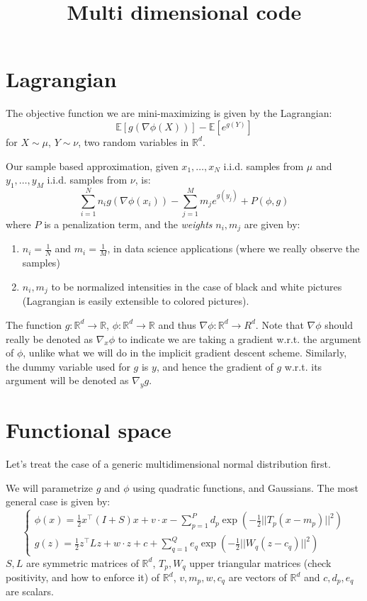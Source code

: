 \documentclass{article}
\title{Multi dimensional code}
\date{}
\theoremstyle{definition}
\theoremstyle{remark}
\newcommand{\R}{\mathbb{R}}
\newcommand{\E}{\mathbb{E}}
\newcommand{\1}{\mathbbm{1}}
\begin{document}
\maketitle
                                     
\section{Lagrangian}
The objective function we are mini-maximizing is given by the Lagrangian:
\[
\E \left[ g(\nabla \phi(X)) \right] - \E \left[ e^{g(Y)} \right] 
\]
for $X \sim \mu$, $Y \sim \nu$, two random variables in $\R^d$.

Our sample based approximation, given $x_1,\ldots,x_N$ i.i.d. samples from $\mu$ and $y_1,\ldots,y_M$ i.i.d. samples from $\nu$, is:
\[
\sum_{i=1}^N n_i g(\nabla \phi(x_i)) - \sum_{j=1}^M m_j e^{g(y_j)} + P(\phi,g)
\]                               
where $P$ is a penalization term, and the \emph{weights} $n_i,m_j$ are given by:
\begin{enumerate}
\item $n_i = \frac{1}{N}$ and $m_i = \frac{1}{M}$, in data science applications (where we really observe the samples)
\item $n_i,m_j$ to be normalized intensities in the case of black and white pictures (Lagrangian is easily extensible to colored pictures).
\end{enumerate}

The function $g : \R^d \to \R$, $\phi: \R^d \to \R$ and thus $\nabla \phi : \R^d \to R^d$. Note that $\nabla \phi$ should really be denoted as $\nabla_x \phi$ to indicate we are taking a gradient w.r.t. the argument of $\phi$, unlike what we will do in the implicit gradient descent scheme. Similarly, the dummy variable used for $g$ is $y$, and hence the gradient of $g$ w.r.t. its argument will be denoted as $\nabla_y g$.

\section{Functional space}
Let's treat the case of a generic multidimensional normal distribution first.

We will parametrize $g$ and $\phi$ using quadratic functions, and Gaussians. The most general case is given by:
\[
\begin{cases}
\phi(x) = {\displaystyle \frac{1}{2} x^{\top} (I+S) x + v \cdot x - \sum_{p=1}^P d_p \exp \left( -\frac{1}{2} ||T_p (x - m_p)||^2 \right)  } \\
g(z) = {\displaystyle \frac{1}{2} z^{\top} L z + w \cdot z + c + \sum_{q=1}^Q e_q \exp \left( -\frac{1}{2} ||W_q (z - c_q)||^2 \right)  } 
\end{cases}
\]
$S,L$ are symmetric matrices of $\R^d$, $T_p, W_q$ upper triangular matrices (check positivity, and how to enforce it) of $\R^d$, $v,m_p,w,c_q$ are vectors of $\R^d$ and $c,d_p,e_q$ are scalars.
\end{document}
